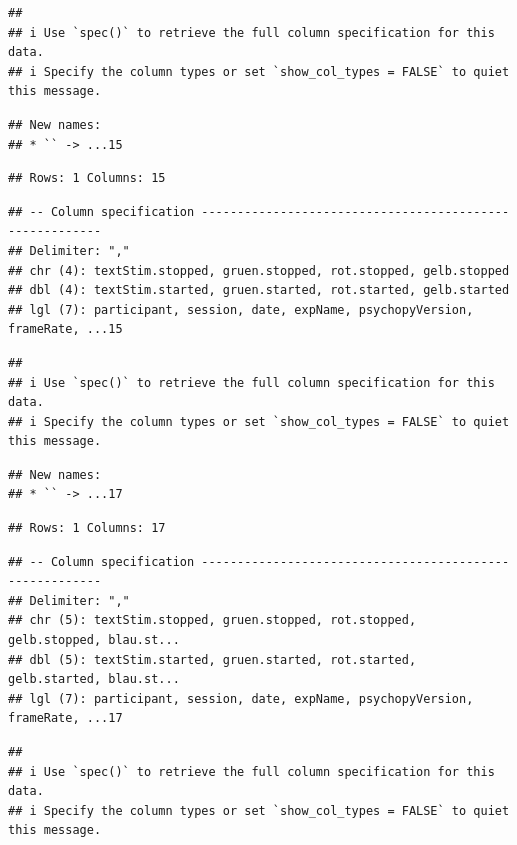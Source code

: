 \documentclass[
]{book}
\begin{document}
\begin{verbatim}
## 
## i Use `spec()` to retrieve the full column specification for this data.
## i Specify the column types or set `show_col_types = FALSE` to quiet this message.
\end{verbatim}

\begin{verbatim}
## New names:
## * `` -> ...15
\end{verbatim}

\begin{verbatim}
## Rows: 1 Columns: 15
\end{verbatim}

\begin{verbatim}
## -- Column specification --------------------------------------------------------
## Delimiter: ","
## chr (4): textStim.stopped, gruen.stopped, rot.stopped, gelb.stopped
## dbl (4): textStim.started, gruen.started, rot.started, gelb.started
## lgl (7): participant, session, date, expName, psychopyVersion, frameRate, ...15
\end{verbatim}

\begin{verbatim}
## 
## i Use `spec()` to retrieve the full column specification for this data.
## i Specify the column types or set `show_col_types = FALSE` to quiet this message.
\end{verbatim}

\begin{verbatim}
## New names:
## * `` -> ...17
\end{verbatim}

\begin{verbatim}
## Rows: 1 Columns: 17
\end{verbatim}

\begin{verbatim}
## -- Column specification --------------------------------------------------------
## Delimiter: ","
## chr (5): textStim.stopped, gruen.stopped, rot.stopped, gelb.stopped, blau.st...
## dbl (5): textStim.started, gruen.started, rot.started, gelb.started, blau.st...
## lgl (7): participant, session, date, expName, psychopyVersion, frameRate, ...17
\end{verbatim}

\begin{verbatim}
## 
## i Use `spec()` to retrieve the full column specification for this data.
## i Specify the column types or set `show_col_types = FALSE` to quiet this message.
\end{verbatim}
\end{document}
